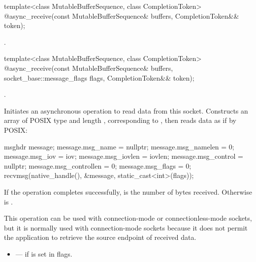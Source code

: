 \begin{itemdecl}
template<class MutableBufferSequence, class CompletionToken>
  @\DEDUCED@ async_receive(const MutableBufferSequence& buffers,
                        CompletionToken&& token);
\end{itemdecl}

\begin{itemdescr}
\pnum
\returns {}.
\end{itemdescr}

\begin{itemdecl}
template<class MutableBufferSequence, class CompletionToken>
  @\DEDUCED@ async_receive(const MutableBufferSequence& buffers,
                        socket_base::message_flags flags,
                        CompletionToken&& token);
\end{itemdecl}

\begin{itemdescr}
\pnum
\completionsig {}.

\pnum
\effects Initiates an asynchronous operation to read data from this socket. Constructs an array  of POSIX type  and length , corresponding to , then reads data as if by POSIX:
\begin{codeblock}
msghdr message;
message.msg_name = nullptr;
message.msg_namelen = 0;
message.msg_iov = iov;
message.msg_iovlen = iovlen;
message.msg_control = nullptr;
message.msg_controllen = 0;
message.msg_flags = 0;
recvmsg(native_handle(), &message, static_cast<int>(flags));
\end{codeblock}


\pnum
If the operation completes successfully,  is the number of bytes received. Otherwise  is .

\pnum
 \begin{note} This operation can be used with connection-mode or connectionless-mode sockets, but it is normally used with connection-mode sockets because it does not permit the application to retrieve the source endpoint of received data. \end{note}

\pnum
\errors
\begin{itemize}
\item
{} --- if  is set in flags.
\end{itemize}
\end{itemdescr}

